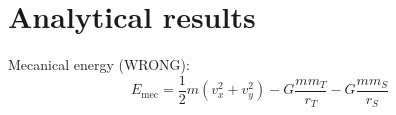 \section{Analytical results}

Mecanical energy (WRONG):
\begin{equation}
    E_\textrm{mec} = \frac{1}{2} m \left( v_x^2 + v_y^2 \right) - G \frac{m m_T}{r_T} - G \frac{m m_S}{r_S}
\end{equation}
